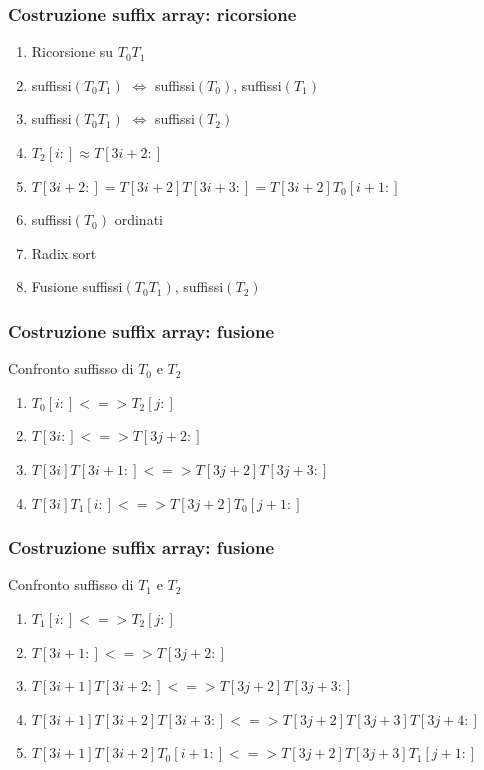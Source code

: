 \begin{frame}
\frametitle{Costruzione suffix array: ricorsione}
\begin{enumerate}
\item
Ricorsione su $T_{0}T_{1}$
\item
suffissi$(T_{0}T_{1})$ $\Leftrightarrow$ suffissi$(T_{0})$, suffissi$(T_{1})$
\item
suffissi$(T_{0}T_{1})$  $\Leftrightarrow$ suffissi$(T_{2})$
\item
$T_{2}[i:] \approx T[3i+2:]$
\item
$T[3i+2:] = T[3i+2]T[3i+3:] =T[3i+2]T_{0}[i+1:]$
\item
suffissi$(T_{0})$ ordinati
\item
Radix sort
\item
Fusione suffissi$(T_{0}T_{1})$,  suffissi$(T_{2})$
\end{enumerate}
\end{frame}

\begin{frame}
\frametitle{Costruzione suffix array: fusione}
Confronto suffisso di $T_{0}$ e $T_{2}$
\begin{enumerate}
\item
$T_{0}[i:] <=> T_{2}[j:]$
\item
$T[3i:] <=> T[3j+2:]$
\item
$T[3i]T[3i+1:] <=> T[3j+2]T[3j+3:]$
\item
$T[3i]T_{1}[i:] <=> T[3j+2]T_{0}[j+1:]$
\end{enumerate}
\end{frame}



\begin{frame}
\frametitle{Costruzione suffix array: fusione}
Confronto suffisso di $T_{1}$ e $T_{2}$
\begin{enumerate}
\item
$T_{1}[i:] <=> T_{2}[j:]$
\item
$T[3i+1:] <=> T[3j+2:]$
\item
$T[3i+1]T[3i+2:] <=> T[3j+2]T[3j+3:]$
\item
$T[3i+1]T[3i+2]T[3i+3:] <=> T[3j+2]T[3j+3]T[3j+4:]$
\item
$T[3i+1]T[3i+2]T_{0}[i+1:] <=> T[3j+2]T[3j+3]T_{1}[j+1:]$
\end{enumerate}
\end{frame}

